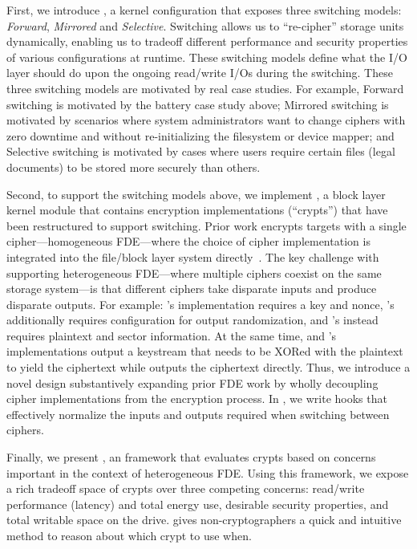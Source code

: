 First, we introduce \sysA, a kernel configuration that exposes three switching
models: {\em Forward}, {\em Mirrored} and {\em Selective}. Switching allows us
to ``re-cipher'' storage units dynamically, enabling us to tradeoff different
performance and security properties of various configurations at runtime. These
switching models define what the I/O layer should do upon the ongoing read/write
I/Os during the switching. These three switching models are motivated by real
case studies. For example, Forward switching is motivated by the battery case
study above; Mirrored switching is motivated by scenarios where system
administrators want to change ciphers with zero downtime and without
re-initializing the filesystem or device mapper; and Selective switching is
motivated by cases where users require certain files (\eg legal documents) to be
stored more securely than others.

Second, to support the switching models above, we implement \sysB, a block layer
kernel module that contains encryption implementations (``crypts'') that have
been restructured to support switching. Prior work encrypts targets with a
single cipher---\ie homogeneous FDE---where the choice of cipher implementation
is integrated into the file/block layer system directly~\cite{StrongBox,
dmcrypt}. The key challenge with supporting heterogeneous FDE---where multiple
ciphers coexist on the same storage system---is that different ciphers take
disparate inputs and produce disparate outputs. For example: \encB's
implementation requires a key and nonce, \encA's additionally requires
configuration for output randomization, and \encC's instead requires plaintext
and sector information. At the same time, \encA and \encB's implementations
output a keystream that needs to be XORed with the plaintext to yield the
ciphertext while \encC outputs the ciphertext directly. Thus, we introduce a
novel design substantively expanding prior FDE work by wholly decoupling cipher
implementations from the encryption process. In \sysB, we write hooks that
effectively normalize the inputs and outputs required when switching between
ciphers.

Finally, we present \sysC, an framework that evaluates crypts based on concerns
important in the context of heterogeneous FDE. Using this framework, we expose a
rich tradeoff space of crypts over three competing concerns: read/write
performance (latency) and total energy use, desirable security properties, and
total writable space on the drive. \sysC gives non-cryptographers a
quick and intuitive method to reason about which crypt to use when.

